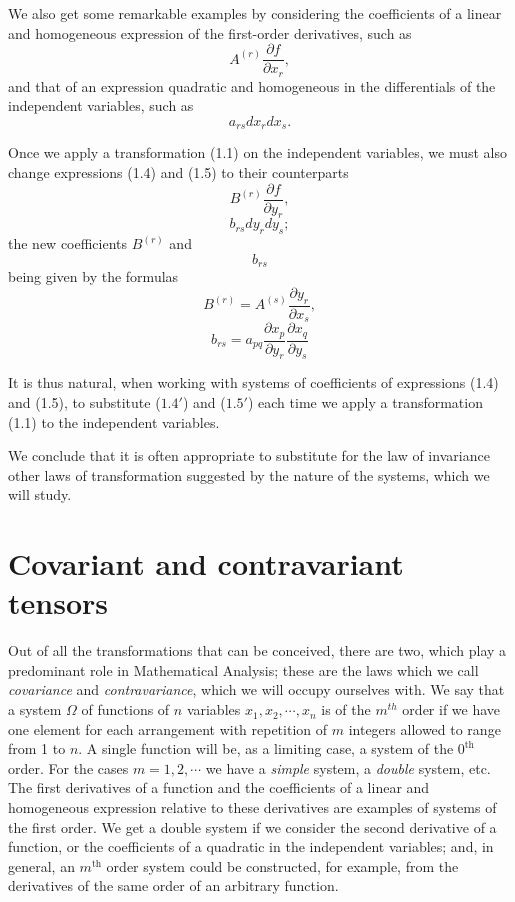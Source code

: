 \documentclass{book}
\begin{document}
We also get some remarkable examples by considering the coefficients of a linear and homogeneous expression of the  first-order derivatives, such as
\begin{equation}
A^{(r)}\frac{\partial f}{\partial x_r},
\end{equation}
and that of an expression quadratic and homogeneous in the differentials of the independent variables, such as
\begin{equation}
a_{rs}dx_rdx_s.
\end{equation}

Once we apply a transformation (1.1) on the independent variables, we must also change expressions (1.4) and (1.5) to their counterparts
$$B^{(r)}\frac{\partial f}{\partial y_r},$$
$$b_{rs}dy_rdy_s;$$
the new coefficients $B^{(r)}$ and $$b_{rs}$$ being given by the formulas
\begin{equation*}
\tag{$1.4'$}
B^{(r)}=A^{(s)}\frac{\partial y_r}{\partial x_s},
\end{equation*}	
\begin{equation*}
\tag{$1.5'$}
b_{rs}=a_{pq}\frac{\partial x_p}{\partial y_r}\frac{\partial x_q}{\partial y_s}
\end{equation*}

It is thus natural, when working with systems of coefficients of expressions (1.4) and (1.5), to substitute ($1.4'$) and ($1.5'$) each time we apply a transformation (1.1) to the independent variables.

We conclude that it is often appropriate to substitute for the law of invariance other laws of transformation suggested by the nature of the systems, which we will study.
\section{Covariant and contravariant tensors}
Out of all the transformations that can be conceived, there are two, which play a predominant role in Mathematical Analysis; these are the laws which we call \emph{covariance} and \emph{contravariance}, which we will occupy ourselves with. We say that a system $\Omega$ of functions of $n$ variables $x_1,x_2,\cdots,x_n$ is of the $m^{th}$ order if we have one element for each arrangement with repetition of $m$ integers allowed to range from 1 to $n$. A single function will be, as a limiting case, a system of the $0^{\text{th}}$ order. For the cases $m=1,2,\cdots$ we have a \emph{simple} system, a \emph{double} system, etc. The first derivatives of a function and the coefficients of a linear and homogeneous expression relative to these derivatives are examples of systems of the first order. We get a double system if we consider the second derivative of a function, or the coefficients of a quadratic in the independent variables; and, in general, an $m^{\text{th}}$ order system could be constructed, for example, from the derivatives of the same order of an arbitrary function.
\end{document}
